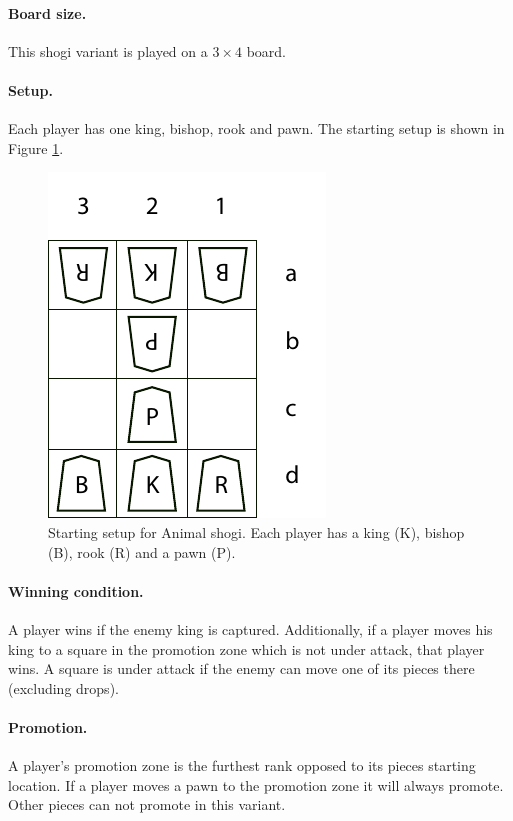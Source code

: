 \documentclass{article}
\begin{document}
{\paragraph{Board size.} This shogi variant is played on a $3 \times 4$ board.

\paragraph{Setup.} Each player has one king, bishop, rook and pawn. The starting setup is shown in Figure \ref{dobutsusetup}.
\begin{figure}[h]
\center
\includegraphics{dobutsushogi.pdf}
\caption{Starting setup for Animal shogi. Each player has a king (K), bishop (B), rook (R) and a pawn (P).}
\label{dobutsusetup}
\end{figure}

\paragraph{Winning condition.} A player wins if the enemy king is captured. Additionally, if a player moves his king to a square in the promotion zone
which is not under attack, that player wins. A square is under attack if the enemy can move one of its pieces there (excluding drops).

\paragraph{Promotion.}  A player's promotion zone is the furthest rank opposed to its pieces starting location. If a player moves a pawn to the promotion zone it will
always promote. Other pieces can not promote in this variant.

}
\end{document}
